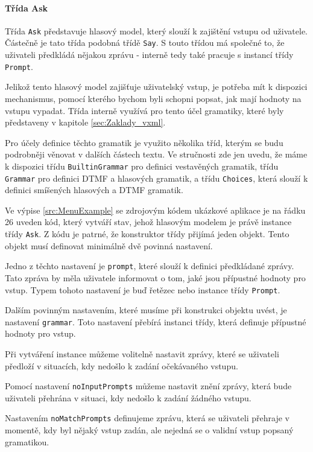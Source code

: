 \documentclass[ing,male,java,dept460,twoside]{diploma}						%
\begin{document}
\paragraph{Třída Ask}
\label{sec:Ask}
Třída \texttt{Ask} představuje hlasový model, který slouží k zajištění vstupu od uživatele. Částečně je tato třída podobná třídě \texttt{Say}. S touto třídou má společné to, že uživateli předkládá nějakou zprávu - interně tedy také pracuje s instancí třídy \texttt{Prompt}.

Jelikož tento hlasový model zajišťuje uživatelský vstup, je potřeba mít k dispozici mechanismus, pomocí kterého bychom byli schopni popsat, jak mají hodnoty na vstupu vypadat. Třída interně využívá pro tento účel gramatiky, které byly představeny v kapitole \ref{sec:Zaklady_vxml}.

Pro účely definice těchto gramatik je využito několika tříd, kterým se budu podrobněji věnovat v dalších částech textu. Ve stručnosti zde jen uvedu, že máme k dispozici třídu \texttt{BuiltinGrammar} pro definici vestavěných gramatik, třídu \texttt{Grammar} pro definici DTMF a hlasových gramatik, a třídu \texttt{Choices}, která slouží k definici smíšených hlasových a DTMF gramatik.

Ve výpise \ref{src:MenuExample} se zdrojovým kódem ukázkové aplikace je na řádku 26 uveden kód, který vytváří stav, jehož hlasovým modelem je právě instance třídy \texttt{Ask}. Z kódu je patrné, že konstruktor třídy přijímá jeden objekt. Tento objekt musí definovat minimálně dvě povinná nastavení.

Jedno z těchto nastavení je \texttt{prompt}, které slouží k definici předkládané zprávy. Tato zpráva by měla uživatele informovat o tom, jaké jsou přípustné hodnoty pro vstup. Typem tohoto nastavení je buď řetězec nebo instance třídy \texttt{Prompt}.

Dalším povinným nastavením, které musíme při konstrukci objektu uvést, je nastavení \texttt{grammar}. Toto nastavení přebírá instanci třídy, která definuje přípustné hodnoty pro vstup.

Při vytváření instance můžeme volitelně nastavit zprávy, které se uživateli předloží v situacích, kdy nedošlo k zadání očekávaného vstupu.

Pomocí nastavení \texttt{noInputPrompts} můžeme nastavit znění zprávy, která bude uživateli přehrána v situaci, kdy nedošlo k zadání žádného vstupu.

Nastavením \texttt{noMatchPrompts} definujeme zprávu, která se uživateli přehraje v momentě, kdy byl nějaký vstup zadán, ale nejedná se o validní vstup popsaný gramatikou.
\end{document}
